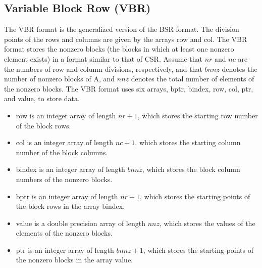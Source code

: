 \documentclass[a4paper]{article}
\begin{document}
\newpage
\subsection{Variable Block Row (VBR)}
The VBR format is the generalized version of the BSR format. The division points of the rows and columns are given by the arrays {\ttfamily row} and {\ttfamily col}. 
The VBR format stores the nonzero blocks (the blocks in which at least
one nonzero element exists) in a format similar to that of CSR. 
Assume that $nr$ and $nc$ are the numbers of row and column divisions, respectively, 
and that $bnnz$ denotes the number of nonzero blocks of A, 
and $nnz$ denotes the total number of elements of the nonzero blocks. 
The VBR format uses six arrays, {\ttfamily bptr}, {\ttfamily bindex}, {\ttfamily
row}, {\ttfamily col}, {\ttfamily ptr}, and {\ttfamily value}, to store data.
\begin{itemize}
\item {\ttfamily row} is an integer array of length $nr+1$, which
      stores the starting row number of the block rows.
\item {\ttfamily col} is an integer array of length $nc+1$, which
      stores the starting column number of the block columns.
\item {\ttfamily bindex} is an integer array of length $bnnz$,
      which stores the block column numbers of the nonzero blocks.
\item {\ttfamily bptr} is an integer array of length $nr+1$,
      which stores the starting points of the block rows in the array {\ttfamily bindex}.
\item {\ttfamily value} is a double precision array of length
      $nnz$, which stores the values of the elements of the nonzero blocks.
\item {\ttfamily ptr} is an integer array of length $bnnz+1$,
      which stores the starting points of the nonzero blocks in the
      array {\ttfamily value}.
\end{itemize}

\newpage
\end{document}

